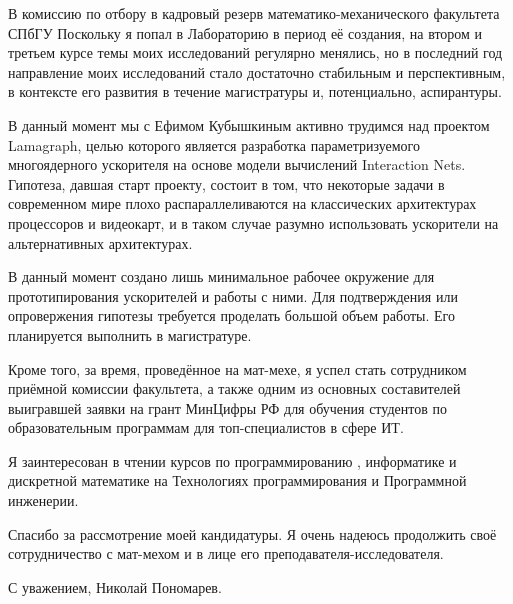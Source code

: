 \documentclass[foldmarks=false, enlargefirstpage=true,
    firstfoot=false, fromphone, fromemail, version=last]{scrlttr2}
\begin{document}
\begin{letter}{В комиссию по отбору в кадровый резерв математико-механического факультета СПбГУ}
    Поскольку я попал в Лабораторию в период её создания, на втором и третьем курсе темы моих исследований регулярно менялись, но в последний год направление моих исследований стало достаточно стабильным и перспективным, в контексте его развития в течение магистратуры и, потенциально, аспирантуры.

    В данный момент мы с Ефимом Кубышкиным активно трудимся над проектом Lamagraph, целью которого является разработка параметризуемого многоядерного ускорителя на основе модели вычислений \textenglish{Interaction Nets}.
    Гипотеза, давшая старт проекту, состоит в том, что некоторые задачи в современном мире плохо распараллеливаются на классических архитектурах процессоров и видеокарт, и в таком случае разумно использовать ускорители на альтернативных архитектурах.

    В данный момент создано лишь минимальное рабочее окружение для прототипирования ускорителей и работы с ними.
    Для подтверждения или опровержения гипотезы требуется проделать большой объем работы.
    Его планируется выполнить в магистратуре.

    Кроме того, за время, проведённое на мат-мехе, я успел стать сотрудником приёмной комиссии факультета, а также одним из основных составителей выигравшей заявки на грант МинЦифры РФ для обучения студентов по образовательным программам для топ-специалистов в сфере ИТ.

    Я заинтересован в чтении курсов по программированию , информатике и дискретной математике на Технологиях программирования и Программной инженерии.

    Спасибо за рассмотрение моей кандидатуры.
    Я очень надеюсь продолжить своё сотрудничество с мат-мехом и в лице его преподавателя-исследователя.

    \closing{С уважением, Николай Пономарев.}
\end{letter}
\end{document}
